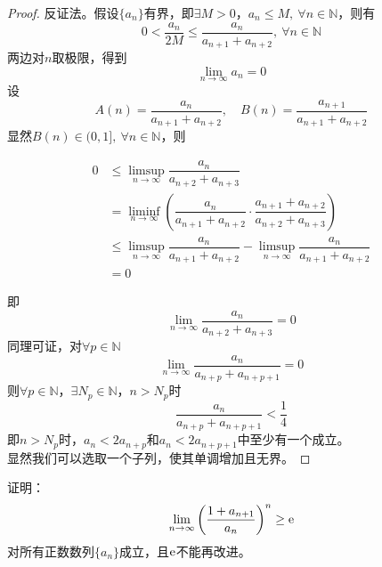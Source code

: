 \begin{proof}
    
    反证法。假设$\{a_n\}$有界，即$\exists M > 0$，$a_n \leq M,\ \forall n \in \mathbb{N}$，则有
    $$0 < \dfrac{a_n}{2M} \leq \dfrac{a_n}{a_{n+1} + a_{n+2}}, \ \forall n \in \mathbb{N}$$
    两边对$n$取极限，得到
    $$\lim_{n\to\infty}{a_n} = 0$$
    设
    $$A(n) = \dfrac{a_n}{a_{n+1} + a_{n+2}}, \quad B(n) = \dfrac{a_{n+1}}{a_{n+1} + a_{n+2}}$$
    显然$B(n) \in (0,1],\  \forall n \in \mathbb{N}$，则
    
    \begin{align*}
        0 & \leq \limsup_{n\to\infty}{\dfrac{a_n}{a_{n+2} + a_{n+3}}} \\
        & = \liminf_{n\to\infty}{\left( \dfrac{a_n}{a_{n+1} + a_{n+2}} \cdot \dfrac{a_{n+1}+a_{n+2}}{a_{n+2} + a_{n+3}} \right)} \\
        & \leq \limsup_{n\to\infty}{\dfrac{a_n}{a_{n+1} + a_{n+2}}} - \limsup_{n\to\infty}{\dfrac{a_n}{a_{n+1} + a_{n+2}}} \\
        & = 0
    \end{align*}
    
    即
    $$\lim_{n\to\infty}{\dfrac{a_n}{a_{n+2} + a_{n+3}}} = 0$$
    同理可证，对$\forall p \in \mathbb{N}$
    $$\lim_{n\to\infty}{\dfrac{a_n}{a_{n+p} + a_{n+p+1}}} = 0$$
    则$\forall p \in \mathbb{N}$，$\exists N_p \in \mathbb{N}$，$n > N_p$时
    $$\dfrac{a_n}{a_{n+p} + a_{n+p+1}} < \dfrac{1}{4}$$
    即$n > N_p$时，$a_n < 2a_{n+p}$和$a_n < 2a_{n + p + 1}$中至少有一个成立。\\
    显然我们可以选取一个子列，使其单调增加且无界。
    
\end{proof}

\begin{proposition}

    证明：
    $$\lim_{n\to\infty}{\left( \dfrac{1+a_{n+1}}{a_n} \right)^n} \geq \mathrm{e}$$
    对所有正数数列$\{a_n\}$成立，且$\mathrm{e}$不能再改进。

\end{proposition}

